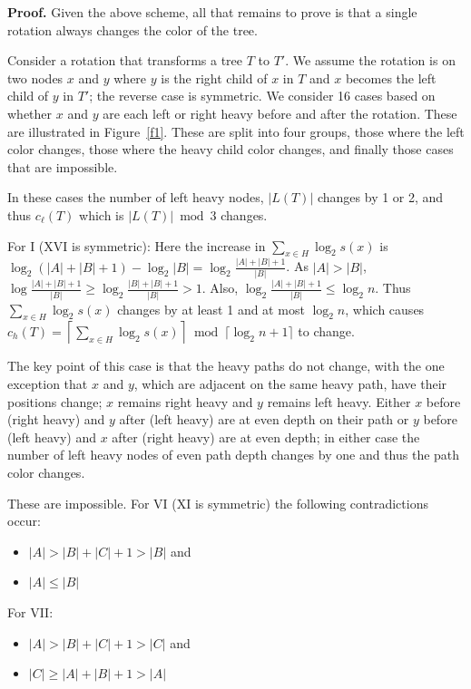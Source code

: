 \documentclass[10pt,a4paper]{article}
\newcommand{\cac}{olive}
\newcommand{\cbc}{teal}
\newcommand{\ccc}{orange}
\newcommand{\cdc}{purple}
\renewenvironment{description}%
{
\begin{basedescript}{
\desclabelstyle{\nextlinelabel}
\renewcommand{\makelabel}[1]{%
\parbox[b]{\columnwidth}{\bfseries##1}%
}%
\desclabelwidth{2em}}}
{
\end{basedescript}
}
\begin{document}
\textbf{Proof.} Given the above scheme, all that remains to prove is that a single rotation always changes the color of the tree.

Consider a rotation that transforms a tree $T$ to $T'$. We assume the rotation is on two nodes $x$ and $y$ where $y$ is the right child of $x$ in $T$ and $x$ becomes the left child of $y$ in $T'$; the reverse case is symmetric. We consider 16 cases based on whether $x$ and $y$ are each left or right heavy before and after the rotation. These are illustrated in Figure~\ref{f1}. These are split into four groups, those where the left color changes, those where the heavy child color changes, and finally those cases that are impossible.

\begin{description}
    \item[\textcolor{\cac}{Cases II-V, VIII, IX, XII-XV (Left color changes)}] In these cases the number of left heavy nodes, $|L(T)|$ changes by 1 or 2, and thus $c_\ell(T)$ which is $|L(T)| \bmod 3$ changes.
    \item[\textcolor{\cbc}{Cases I and XVI (Heavy child color changes)}] For I (XVI is symmetric): Here the increase in $\sum_{x \in H} \log_2 s(x)$ is $\log_2 (|A|+|B|+1) - \log_2 |B| = \log_2 \frac{|A|+|B|+1}{|B|}$. 
    As $|A|>|B|$, $\log \frac{|A|+|B|+1}{|B|}\geq \log_2 \frac{|B|+|B|+1}{|B|}>1$. Also, $\log_2 \frac{|A|+|B|+1}{|B|}\leq \log_2 n$. Thus $\sum_{x \in H} \log_2 s(x)$ changes by at least 1 and at most $\log_2 n$, which causes $c_h(T) = \left\lceil  \sum_{x \in H} \log_2 s(x) \right\rceil \bmod \lceil \log_2n+1 \rceil$ to change.
    \item[\textcolor{\cdc}{Case X}] The key point of this case is that the heavy paths do not change, with the one exception that $x$ and $y$, which are adjacent on the same heavy path, have their positions change; $x$ remains right heavy and $y$ remains left heavy. Either $x$ before (right heavy) and $y$ after (left heavy) are at even depth on their path or $y$ before (left heavy) and $x$ after (right heavy) are at even depth; in either case the number of left heavy nodes of even path depth changes by one and thus the path color changes.
    \item[\textcolor{\ccc}{Cases VI, VII and XI (Impossible)}] These are impossible. For VI (XI is symmetric) the following contradictions occur:
    \begin{itemize}[topsep=0pt]
        \item $|A|>|B|+|C|+1>|B|$ and
        \item $|A|\leq |B|$
    \end{itemize}
    For VII:
      \begin{itemize}[topsep=0pt]
        \item $|A|>|B|+|C|+1>|C|$ and
        \item $|C|\geq |A|+|B|+1>|A|$
    \end{itemize}  
\end{description}
\end{document}
